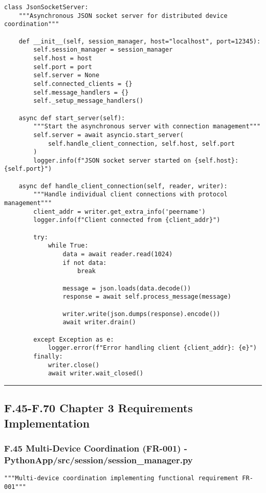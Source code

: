 \documentclass[12pt,a4paper]{report}
\begin{document}
{{\begin{verbatim}
class JsonSocketServer:
    """Asynchronous JSON socket server for distributed device coordination"""

    def __init__(self, session_manager, host="localhost", port=12345):
        self.session_manager = session_manager
        self.host = host
        self.port = port
        self.server = None
        self.connected_clients = {}
        self.message_handlers = {}
        self._setup_message_handlers()

    async def start_server(self):
        """Start the asynchronous server with connection management"""
        self.server = await asyncio.start_server(
            self.handle_client_connection, self.host, self.port
        )
        logger.info(f"JSON socket server started on {self.host}:{self.port}")

    async def handle_client_connection(self, reader, writer):
        """Handle individual client connections with protocol management"""
        client_addr = writer.get_extra_info('peername')
        logger.info(f"Client connected from {client_addr}")

        try:
            while True:
                data = await reader.read(1024)
                if not data:
                    break

                message = json.loads(data.decode())
                response = await self.process_message(message)

                writer.write(json.dumps(response).encode())
                await writer.drain()

        except Exception as e:
            logger.error(f"Error handling client {client_addr}: {e}")
        finally:
            writer.close()
            await writer.wait_closed()
\end{verbatim}

\hrule

\subsection{F.45-F.70 Chapter 3 Requirements Implementation}

\subsubsection{F.45 Multi-Device Coordination (FR-001) - PythonApp/src/session/session_manager.py}

\begin{verbatim}
"""Multi-device coordination implementing functional requirement FR-001"""



\end{verbatim}}}
\end{document}
